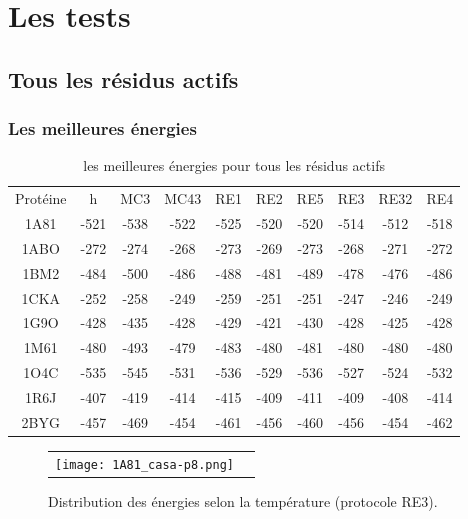     
    \clearpage
    \section{Les tests} 
   \subsection{Tous les résidus actifs} 


   \subsubsection{Les meilleures énergies} 

    \begin{table}[h]
      \centering

      \begin{tabular}{cccccccccc}

        \toprule
        Protéine & h & MC3 & MC43 & RE1 & RE2 & RE5 & RE3 & RE32 & RE4 \\
        \cmidrule{1-10}
        1A81 & -521 & -538 & -522 & -525 & -520 & -520 & -514 & -512 & -518 \\
        1ABO & -272 & -274 & -268 & -273 & -269 & -273 & -268 & -271 & -272 \\
        1BM2 & -484 & -500 & -486 & -488 & -481 & -489 & -478 & -476 & -486 \\
        1CKA & -252 & -258 & -249 & -259 & -251 & -251 & -247 & -246 & -249 \\
        1G9O & -428 & -435 & -428 & -429 & -421 & -430 & -428 & -425 & -428 \\
        1M61 & -480 & -493 & -479 & -483 & -480 & -481 & -480 & -480 & -480 \\
        1O4C & -535 & -545 & -531 & -536 & -529 & -536 & -527 & -524 & -532 \\
        1R6J & -407 & -419 & -414 & -415 & -409 & -411 & -409 & -408 & -414 \\
        2BYG & -457 & -469 & -454 & -461 & -456 & -460 & -456 & -454 & -462 \\
  
        \bottomrule

      \end{tabular}      
      \caption{les meilleures énergies pour tous les résidus actifs}
\label{tab:best_ener_all_all}      
    \end{table}


   \begin{figure}[t]
     \centering
     \begin{tabular}{cc}
       \texttt{[image: 1A81\_casa-p8.png]} &
     \end{tabular}
     
     \caption{Distribution des énergies selon la température (protocole RE3).}
\label{graph:Distrib_E_T}
   \end{figure}


